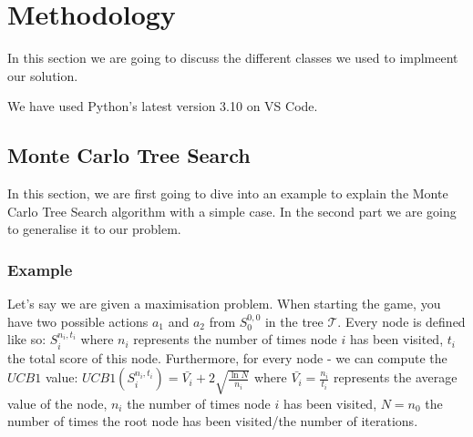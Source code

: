 \chapter{Methodology}
\label{Chapter4}
In this section we are going to discuss the different classes we used to implmeent our solution.

We have used Python's latest version 3.10 on VS Code.
\newpage


\newpage
\section{Monte Carlo Tree Search} 
In this section, we are first going to dive into an example to explain the Monte Carlo Tree Search algorithm with a simple case. In the second part we are going to generalise it to our problem.

\subsection{Example }
\label{Example}
Let's say we are given a maximisation problem. When starting the game, you have two possible actions $a_1$ and $a_2$ from $S^{0,0}_0$ in the tree $\mathcal{T}$.
Every node is defined like so: $S^{n_i,t_i}_i$ where $n_i$ represents the number of times node $i$ has been visited, $t_i$ the total score of this node.
Furthermore, for every node - we can compute the $UCB1$ value: $UCB1(S^{n_i,t_i}_i)=\bar{V_i} + 2 \sqrt{\frac{\ln N}{n_i}}$ where $\bar{V_i}=\frac{n_i}{t_i}$ represents the average value of the node, $n_i$ the number of times node $i$ has been visited, $N=n_0$ the number of times the root node has been visited/the number of iterations.

